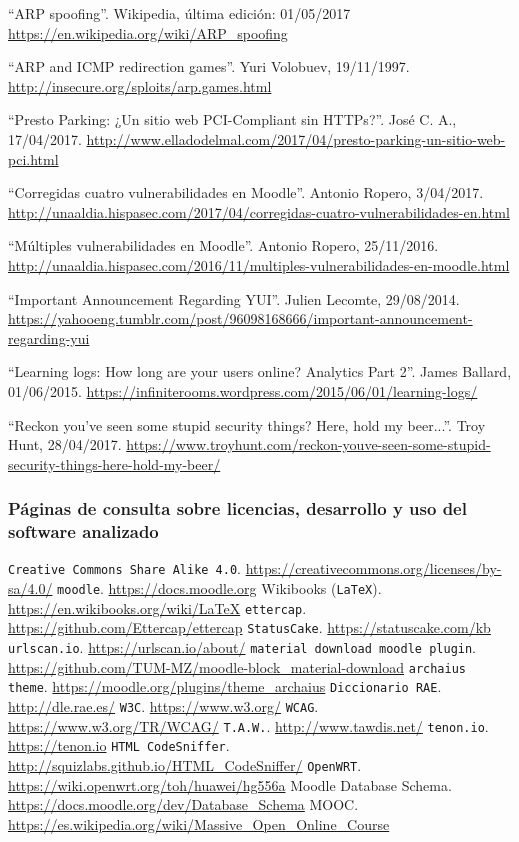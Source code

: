  ``ARP spoofing''. Wikipedia, última edición: 01/05/2017 \url{https://en.wikipedia.org/wiki/ARP_spoofing}

 ``ARP and ICMP redirection games''. Yuri Volobuev, 19/11/1997. \url{http://insecure.org/sploits/arp.games.html}

 ``Presto Parking: ¿Un sitio web PCI-Compliant sin HTTPs?''. José C. A., 17/04/2017. \url{http://www.elladodelmal.com/2017/04/presto-parking-un-sitio-web-pci.html}

 ``Corregidas cuatro vulnerabilidades en Moodle''. Antonio Ropero, 3/04/2017. \url{http://unaaldia.hispasec.com/2017/04/corregidas-cuatro-vulnerabilidades-en.html}

 ``Múltiples vulnerabilidades en Moodle''. Antonio Ropero, 25/11/2016. \url{http://unaaldia.hispasec.com/2016/11/multiples-vulnerabilidades-en-moodle.html}

 ``Important Announcement Regarding YUI''. Julien Lecomte, 29/08/2014. \url{https://yahooeng.tumblr.com/post/96098168666/important-announcement-regarding-yui}

 ``Learning logs: How long are your users online? Analytics Part 2''. James Ballard, 01/06/2015. \url{https://infiniterooms.wordpress.com/2015/06/01/learning-logs/}

 ``Reckon you've seen some stupid security things? Here, hold my beer...''. Troy Hunt, 28/04/2017. \url{https://www.troyhunt.com/reckon-youve-seen-some-stupid-security-things-here-hold-my-beer/}

\bigskip
\subsubsection*{Páginas de consulta sobre licencias, desarrollo y uso del software analizado}
 {\tt Creative Commons Share Alike 4.0}. \url{https://creativecommons.org/licenses/by-sa/4.0/}
 {\tt moodle}. \url{https://docs.moodle.org}
 Wikibooks ({\tt LaTeX}). \url{https://en.wikibooks.org/wiki/LaTeX}
 {\tt ettercap}. \url{https://github.com/Ettercap/ettercap}
 {\tt StatusCake}. \url{https://statuscake.com/kb}
 {\tt urlscan.io}. \url{https://urlscan.io/about/}
 {\tt material download moodle plugin}. \url{https://github.com/TUM-MZ/moodle-block_material-download}
 {\tt archaius theme}. \url{https://moodle.org/plugins/theme_archaius}
 {\tt Diccionario RAE}. \url{http://dle.rae.es/}
 {\tt W3C}. \url{https://www.w3.org/}
 {\tt WCAG}. \url{https://www.w3.org/TR/WCAG/}
 {\tt T.A.W.}. \url{http://www.tawdis.net/}
 {\tt tenon.io}. \url{https://tenon.io}
 {\tt HTML CodeSniffer}. \url{http://squizlabs.github.io/HTML_CodeSniffer/}
 {\tt OpenWRT}. \url{https://wiki.openwrt.org/toh/huawei/hg556a}
 Moodle Database Schema. \url{https://docs.moodle.org/dev/Database_Schema}
 MOOC. \url{https://es.wikipedia.org/wiki/Massive_Open_Online_Course}




